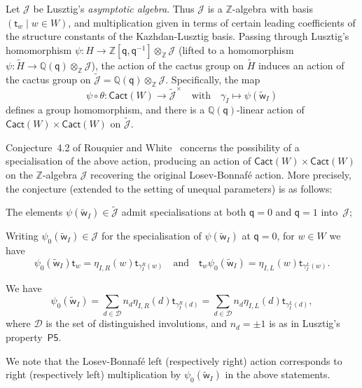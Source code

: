 \documentclass[11pt]{article}
\theoremstyle{plain}
\theoremstyle{definition}
\numberwithin{equation}{section}
\def\tw{\widetilde{\mathsf{w}}_I}
\def\cact{\mathsf{Cact}}
\def\cD{\mathcal{D}}
\def\cJ{\mathcal{J}}
\def\QQ{\mathbb{Q}}
\def\ZZ{\mathbb{Z}}
\newcommand{\st}{\mathsf{t}}
\newcommand{\sq}{\mathsf{q}}
\begin{document}
Let $\cJ$ be Lusztig's \textit{asymptotic algebra}. Thus $\cJ$ is a $\ZZ$-algebra with basis $(\st_w\mid w\in W)$, and multiplication given in terms of certain leading coefficients of the structure constants of the Kazhdan-Lusztig basis. Passing through Lusztig's homomorphism $\psi:H\to\ZZ[\sq,\sq^{-1}]\otimes_{\ZZ}\cJ$ (lifted to a homomorphism $\psi:\tilde{H}\to\QQ(\sq)\otimes_{\ZZ}\cJ$), the action of the cactus group on $\tilde{H}$ induces an action of the cactus group on $\tilde{\cJ}=\QQ(\sq)\otimes_{\ZZ}\cJ$. Specifically, the map
$$
\psi\circ\theta:\cact(W)\to \tilde{\cJ}^{\times}\quad\text{with}\quad \gamma_I\mapsto \psi(\tw)
$$
defines a group homomorphism, and there is a $\QQ(\sq)$-linear action of $\cact(W)\times\cact(W)$ on $\tilde{\cJ}$. 

Conjecture~4.2 of Rouquier and White~\cite{RW:24} concerns the possibility of a specialisation of the above action, producing an action of $\cact(W)\times\cact(W)$ on the $\ZZ$-algebra $\cJ$ recovering the original Losev-Bonnaf\'e action. More precisely, the conjecture (extended to the setting of unequal parameters) is as follows:
\smallskip

\begin{compactenum}[$(1)$]
\item The elements $\psi(\tw)\in\tilde{\cJ}$ admit specialisations at both $\sq=0$ and $\sq=1$ into~$\cJ$;
\item Writing $\psi_0(\tw)\in\cJ$ for the specialisation of $\psi(\tw)$ at $\sq=0$, for $w\in W$ we have 
$$
\psi_0(\tw)\st_w=\eta_{I,R}(w)\st_{\gamma_I^R(w)}\quad\text{and}\quad \st_w\psi_0(\tw)=\eta_{I,L}(w)\st_{\gamma_I^L(w)}. 
$$
\item We have
$$
\psi_0(\tw)=\sum_{d\in\cD}n_d\eta_{I,R}(d)\st_{\gamma_I^R(d)}=\sum_{d\in\cD}n_d\eta_{I,L}(d)\st_{\gamma_I^L(d)},
$$
where $\cD$ is the set of distinguished involutions, and $n_d=\pm1$ is as in Lusztig's property~$\mathsf{P5}$. 
\end{compactenum}
\smallskip



\noindent We note that the Losev-Bonnaf\'e left (respectively right) action corresponds to right (respectively left) multiplication by $\psi_0(\tw)$ in the above statements. 
\end{document}
